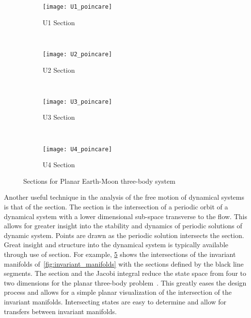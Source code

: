 \documentclass[letterpaper, paper,11pt]{AAS}		%
\begin{document}
\begin{figure}
     \centering
        \begin{subfigure}[b]{0.25\textwidth}
                \texttt{[image: U1\_poincare]}
                \caption{U1 Section}
                \label{fig:u1_poincare}
        \end{subfigure}%
        ~%
        \begin{subfigure}[b]{0.25\textwidth}
                \texttt{[image: U2\_poincare]}
                \caption{U2 Section}
                \label{fig:u2_poincare}
        \end{subfigure}~
        \begin{subfigure}[b]{0.25\textwidth}
                \texttt{[image: U3\_poincare]}
                \caption{U3 Section}
                \label{fig:u3_poincare}
        \end{subfigure}%
        ~%
        \begin{subfigure}[b]{0.25\textwidth}
                \texttt{[image: U4\_poincare]}
                \caption{U4 Section}
                \label{fig:u4_poincare}
        \end{subfigure}
        \caption{\Poincare Sections for Planar Earth-Moon three-body system}
	\label{fig:poincare_sections}
\end{figure}

Another useful technique in the analysis of the free motion of dynamical systems is that of the \Poincare section.
The \Poincare section is the intersection of a periodic orbit of a dynamical system with a lower dimensional sub-space transverse to the flow.
This allows for greater insight into the stability and dynamics of periodic solutions of dynamic system. 
Points are drawn as the periodic solution intersects the \Poincare section.
Great insight and structure into the dynamical system is typically available through use of \Poincare section.
For example, \cref{fig:poincare_sections} shows the intersections of the invariant manifolds of~\cref{fig:invariant_manifolds} with the \Poincare sections defined by the black line segments.
The \Poincare section and the Jacobi integral reduce the state space from four to two dimensions for the planar three-body problem~\cite{koon2001}.
This greatly eases the design process and allows for a simple planar visualization of the intersection of the invariant manifolds.
Intersecting states are easy to determine and allow for transfers between invariant manifolds.
\end{document}
